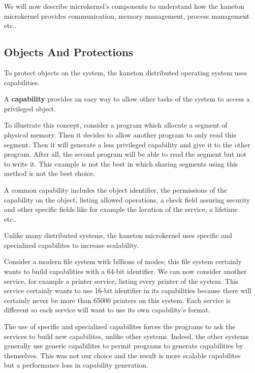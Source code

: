 \documentclass[10pt,a4wide]{article}
\begin{document}
\begin{multicols}{2}
\begin{enumerate}
\end{enumerate}

We will now describe microkernel's components to understand how the kaneton
microkernel provides communication, memory management, process management etc..

\subsection{Objects And Protections}

To protect objects on the system, the kaneton distributed operating system uses
capabilities.

A \textbf{capability} provides an easy way to allow other tasks of the
system to access a privileged object.

To illustrate this concept, consider a program which allocate a segment of
physical memory. Then it decides to allow another program to only read
this segment. Then it will generate a less privileged capability and give
it to the other program. After all, the second program will be able to read
the segment but not to write it. This example is not the best in which sharing
segments using this method is not the best choice.

A common capability includes the object identifier, the permissions of the
capability on the object, listing allowed operations, a check field assuring
security and other specific fields like for example the location of the
service, a lifetime etc..

Unlike many distributed systems, the kaneton microkernel uses specific and
specialized capabilites to increase scalability.

Consider a modern file system with billions of inodes; this file system
certainly wants to build capabilities with a 64-bit identifier.
We can now consider another service, for example a printer service, listing
every printer of the system. This service certainly wants to use 16-bit
identifier in its capabilities because there will certainly never be more than
65000 printers on this system. Each service is different so each service
will want to use its own capability's format.

The use of specific and specialized capabilites forces the programs to ask
the services to build new capabilites, unlike other systems. Indeed,
the other systems generally use generic capabilites to permit programs to
generate capabilities by themselves. This was not our choice and the result is
more scalable capabilites but a performance loss in capability generation.


\end{multicols}
\end{document}
